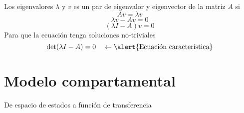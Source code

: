 \documentclass[presentation,aspectratio=1610]{beamer}
\begin{document}
\begin{frame}[label={sec:org35dbfa5}]{Los eigenvalores}
\(\lambda\) y \(v\) es un par de eigenvalor y eigenvector de la matriz \(A\) si
\[Av = \lambda v\]
\pause
\[ \lambda v - Av = 0\]
\pause
\[ (\lambda I - A)v = 0\]
\pause
Para que la ecuación tenga soluciones no-triviales
 \[ \det (\lambda I - A) = 0 \quad \leftarrow \text{\alert{Ecuación característica}}\]
\end{frame}


\section{Modelo compartamental}
\label{sec:org7011124}

\begin{frame}[label={sec:orgf76ba5f}]{De espacio de estados a función de transferencia}
\end{frame}
\end{document}
